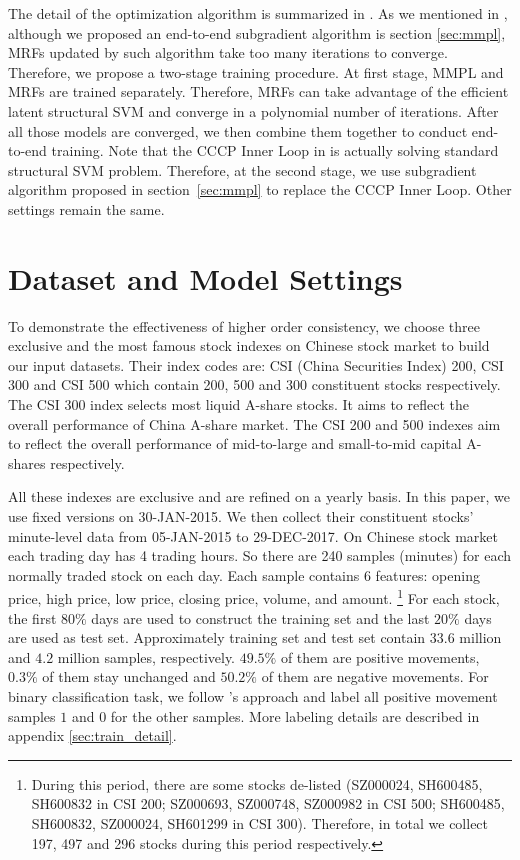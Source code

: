 The detail of the optimization algorithm is summarized in
. As we mentioned in
, although we proposed an end-to-end
subgradient algorithm is section \ref{sec:mmpl}, MRFs updated by
such algorithm take too many iterations to converge. Therefore,
we propose a two-stage training procedure. At first stage, MMPL
and MRFs are trained separately. Therefore, MRFs can take
advantage of the efficient latent structural SVM and converge in
a polynomial number of iterations. After all those models are
converged, we then combine them together to conduct end-to-end
training. Note that the CCCP Inner Loop in
 is actually solving standard structural
SVM problem. Therefore, at the second stage, we use subgradient
algorithm proposed in section~\ref{sec:mmpl} to replace the CCCP
Inner Loop. Other settings remain the same.

\section{Dataset and Model Settings}
\label{sec:dataset}

To demonstrate the effectiveness of higher order consistency, we
choose three exclusive and the most famous stock indexes on Chinese
stock market to build our input datasets. Their index codes are:
CSI (China Securities Index) 200, CSI 300 and CSI 500 which
contain 200, 500 and 300 constituent stocks respectively. The CSI
300 index selects most liquid A-share stocks. It aims to reflect
the overall performance of China A-share market. The CSI 200 and
500 indexes aim to reflect the overall performance of mid-to-large
and small-to-mid capital A-shares respectively.

All these indexes are exclusive and are refined on a yearly
basis. In this paper, we use fixed versions on 30-JAN-2015. We
then collect their constituent stocks' minute-level data from
05-JAN-2015 to 29-DEC-2017. On Chinese stock market each trading
day has 4 trading hours. So there are 240 samples (minutes) for
each normally traded stock on each day. Each sample contains 6
features: opening price, high price, low price, closing price,
volume, and amount. \footnote{During this period, there are some
  stocks de-listed (SZ000024, SH600485, SH600832 in CSI 200;
  SZ000693, SZ000748, SZ000982 in CSI 500; SH600485, SH600832,
  SZ000024, SH601299 in CSI 300). Therefore, in total we collect
  197, 497 and 296 stocks during this period respectively.} For
each stock, the first $80\%$ days are used to construct the
training set and the last $20\%$ days are used as test set.
Approximately training set and test set contain $33.6$ million
and $4.2$ million samples, respectively. $49.5\%$ of them are
positive movements, $0.3\%$ of them stay unchanged and $50.2\%$
of them are negative movements. For binary classification task,
we follow 's approach and
label all positive movement samples $1$ and $0$ for the other
samples. More labeling details are described in appendix
\ref{sec:train_detail}.

